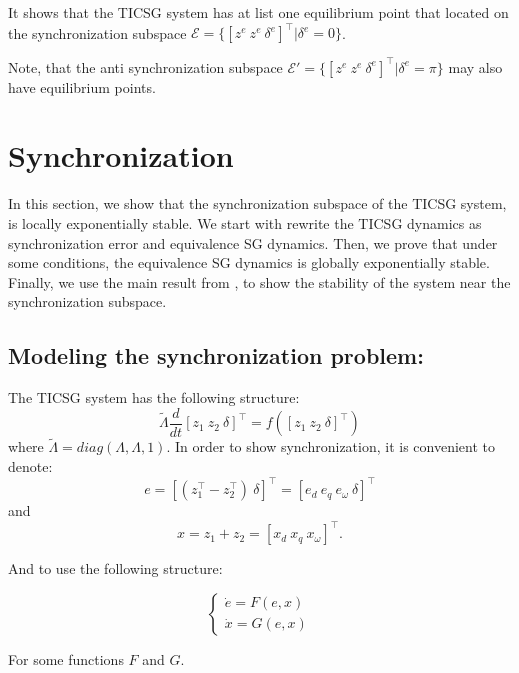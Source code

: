 \documentclass[letterpaper, 10 pt, conference]{ieeeconf}  %
\begin{document}
It shows that the TICSG system has at list one equilibrium point  that located on the synchronization subspace $ \mathscr{E}=\{ \left[z^e \ z^e \ \delta^e  \right]^\top   |  \delta^e= 0\}$.

Note, that the anti synchronization subspace  $\mathscr{E} '=\{ \left[z^e \ z^e \ \delta^e  \right]^\top   |  \delta^e=\pi \}$ may also have equilibrium points.

\section{Synchronization}

In this section, we show that the synchronization subspace of the TICSG system, is locally exponentially stable.
We start with rewrite the TICSG dynamics as synchronization error
 and equivalence SG dynamics. Then, we  prove that under
some conditions, the equivalence SG dynamics is globally exponentially
stable. Finally, we use the main result from  \cite{AndrieuJayawardhanaPraly},
to show the stability of the system near the synchronization subspace.

\subsection{Modeling the synchronization problem:}
The TICSG system has the following structure:
$$ \tilde{\Lambda}\frac{d}{dt}\left[z_1\ z_2\ \delta\right]^{\top}= f\left( \left[z_1\ z_2\ \delta\right]^{\top} \right)$$
where $\tilde{\Lambda} = diag \left( \Lambda,\Lambda,1 \right) $.
In order to show synchronization, it is convenient to denote:
$$e =  \left[\left(z_1^\top-z_2^\top \right)\ \delta \right]^\top = \left[e_d\ e_q\ e_{\omega}\ \delta \right]^\top $$
and 
$$x =z_1+z_2 = \left[ x_d\ x_q\ x_\omega\right]^\top.$$  

And to use the following structure:

\begin{equation}
\left\{ \begin{array}{c}
\dot{e}=F(e,x)\\
\dot{x}=G(e,x)
\end{array}\right.\label{eq:sync_sestem}
\end{equation}

For some functions $F$ and $G$. 
\end{document}
